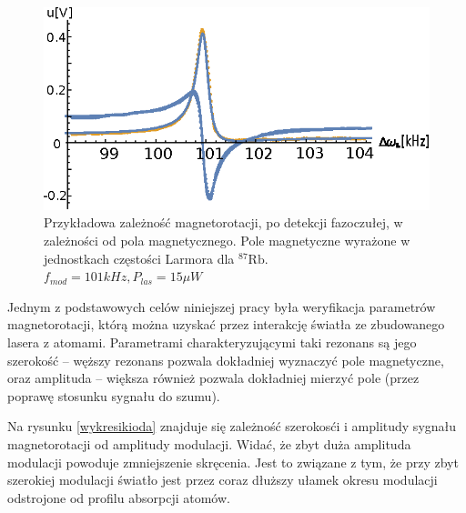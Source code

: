 \documentclass[a4paper,10pt]{article}
\begin{document}
\begin{figure}[h!]
\centering
 \includegraphics[width=\textwidth]{magnetorot1.eps}
 \caption{Przykładowa zależność magnetorotacji, po detekcji fazoczułej, w zależności od pola magnetycznego. Pole magnetyczne wyrażone w jednostkach częstości Larmora dla ${}^{87} \mathrm{Rb}$.
 $f_{mod}=101kHz, P_{las}=15 \mu W$}
 \label{fig:magnetorot1}
\end{figure}

Jednym z podstawowych celów niniejszej pracy była weryfikacja parametrów magnetorotacji, którą można uzyskać przez interakcję światła ze zbudowanego lasera z atomami.
Parametrami charakteryzującymi taki rezonans są jego  szerokość -- węższy rezonans pozwala dokładniej wyznaczyć pole magnetyczne, oraz amplituda -- większa również pozwala dokładniej mierzyć pole (przez poprawę stosunku sygnału do szumu).

Na rysunku \ref{wykresikioda} znajduje się zależność szerokosći i amplitudy sygnału magnetorotacji od amplitudy modulacji. Widać, że zbyt duża amplituda modulacji powoduje zmniejszenie skręcenia. Jest to związane z tym, że przy zbyt szerokiej modulacji światło jest przez coraz dłuższy ułamek okresu modulacji odstrojone od profilu absorpcji atomów. 
\end{document}
